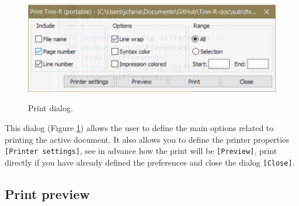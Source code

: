 \begin{figure}[H]
  \includegraphics[scale=0.50]{./res/dlg_print.png} \\
  \caption{Print dialog.}
  \label{fig:dlg_print}
\end{figure}
This dialog
(Figure \ref{fig:dlg_print})
allows the user to define the main options related to printing the active document.
It also allows you to define the printer properties \texttt{[Printer settings]},
see in advance how the print will be \texttt{[Preview]},
print directly if you have already defined the preferences and close the dialog \texttt{[Close]}.


\hypertarget{dlg_print_preview}{}
\subsection{Print preview}

